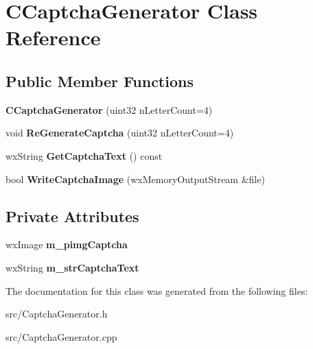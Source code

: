 \section{CCaptchaGenerator Class Reference}
\label{classCCaptchaGenerator}
\subsection*{Public Member Functions}
\begin{DoxyCompactItemize}
\item 
{\bfseries CCaptchaGenerator} (uint32 nLetterCount=4)\label{classCCaptchaGenerator_a077f7064e69bda040fc3f4ce0f82de2b}

\item 
void {\bfseries ReGenerateCaptcha} (uint32 nLetterCount=4)\label{classCCaptchaGenerator_ac3a999a25e9dd2184216eea394c2ff0e}

\item 
wxString {\bfseries GetCaptchaText} () const \label{classCCaptchaGenerator_a0fc88c6c586844eb85ddd2f45361a8d6}

\item 
bool {\bfseries WriteCaptchaImage} (wxMemoryOutputStream \&file)\label{classCCaptchaGenerator_abefe54c9c2e213bf103f1b98db6e78dd}

\end{DoxyCompactItemize}
\subsection*{Private Attributes}
\begin{DoxyCompactItemize}
\item 
wxImage {\bfseries m\_\-pimgCaptcha}\label{classCCaptchaGenerator_a54aede841786e23d6106c86cdb84bc1b}

\item 
wxString {\bfseries m\_\-strCaptchaText}\label{classCCaptchaGenerator_a31f634e32aa12a2f2f9e8feccb5b5aa0}

\end{DoxyCompactItemize}


The documentation for this class was generated from the following files:\begin{DoxyCompactItemize}
\item 
src/CaptchaGenerator.h\item 
src/CaptchaGenerator.cpp\end{DoxyCompactItemize}
